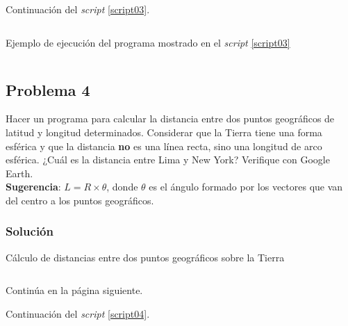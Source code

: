 \documentclass[a4paper,12pt,final]{article}
\begin{document}
      \newpage
      \noindent\small{Continuación del \emph{script} \ref{script03}}.
      \vspace{-1em}
      \begin{listing}[H]
        \inputminted[firstline=51]{matlab}{./laboratorio_1/problema03.m}
      \end{listing}
      \vspace{\fill}

      \newpage
      \begin{listing}[H]
        \caption{Ejemplo de ejecución del programa mostrado en el
        \emph{script} \ref{script03}}
        \label{script03sample}
        \inputminted{text}{./laboratorio_1/problema03_sample.txt}
      \end{listing}
      \vspace{\fill}

  \newpage
  \subsection*{Problema 4}
    \noindent Hacer un programa para calcular la distancia entre dos puntos
    geográficos de latitud y longitud determinados. Considerar que la
    Tierra tiene una forma esférica y que la distancia \textbf{no} es una
    línea recta, sino una longitud de arco esférica. ¿Cuál es la distancia
    entre Lima y New York? Verifique con Google Earth.\\

    \noindent\textbf{Sugerencia}: $L=R\times\theta$, donde $\theta$ es el ángulo
    formado por los vectores que van del centro a los puntos geográficos.

    \subsubsection*{Solución}
      \begin{listing}[H]
        \caption{Cálculo de distancias entre dos puntos geográficos sobre la
        Tierra}
        \label{script04}
        \inputminted[firstline=5,lastline=43]{matlab}{./laboratorio_1/problema04.m}
      \end{listing}
      \vspace{-1em}
      \noindent\small{Continúa en la página siguiente.}
      \vspace{\fill}

      \newpage
      \noindent\small{Continuación del \emph{script} \ref{script04}.}
      \vspace{-1em}
      \begin{listing}[H]
        \inputminted[firstline=45]{matlab}{./laboratorio_1/problema04.m}
      \end{listing}
\end{document}
